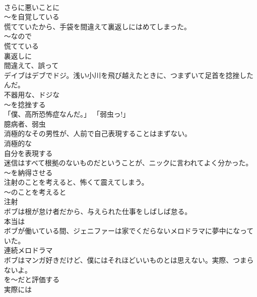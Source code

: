 \documentclass[8pt]{extreport}
\begin{document}
\begin{CJK}{UTF8}{min}
\\	さらに悪いことに 
\\	～を自覚している
\\	慌てていたから、手袋を間違えて裏返しにはめてしまった。	
\\	～なので 
\\	慌てている 
\\	裏返しに 
\\	間違えて、誤って
\\	デイブはデブでドジ。浅い小川を飛び越えたときに、つまずいて足首を捻挫したんだ。	
\\	不器用な、ドジな 
\\	～を捻挫する
\\	「僕、高所恐怖症なんだ。」 「弱虫っ!」	
\\	臆病者、弱虫
\\	消極的なその男性が、人前で自己表現することはまずない。	
\\	消極的な 
\\	自分を表現する
\\	迷信はすべて根拠のないものだということが、ニックに言われてよく分かった。	
\\	～を納得させる
\\	注射のことを考えると、怖くて震えてしまう。	
\\	～のことを考えると 
\\	注射
\\	ボブは根が怠け者だから、与えられた仕事をしばしば怠る。	
\\	本当は
\\	ボブが働いている間、ジェニファーは家でくだらないメロドラマに夢中になっていた。	
\\	連続メロドラマ
\\	ボブはマンガ好きだけど、僕にはそれほどいいものとは思えない。実際、つまらないよ。	
\\	を～だと評価する 
\\	実際には
\end{CJK}
\end{document}
